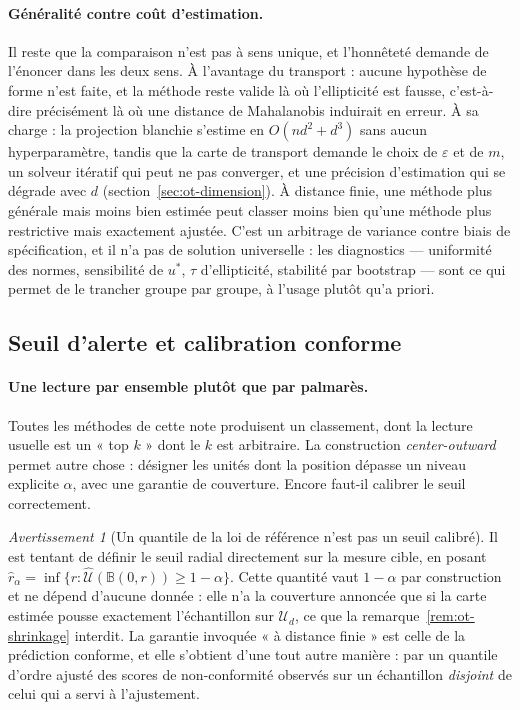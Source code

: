 \documentclass[11pt,a4paper]{article}
\theoremstyle{definition}
\theoremstyle{remark}
\newtheorem{avertissement}{Avertissement}[section]
\newcommand{\Unif}{\mathcal{U}}
\newcommand{\Bball}{\mathbb{B}}
\begin{document}
\paragraph{Généralité contre coût d'estimation.} Il reste que la comparaison n'est pas à
sens unique, et l'honnêteté demande de l'énoncer dans les deux sens. À l'avantage du
transport : aucune hypothèse de forme n'est faite, et la méthode reste valide là où
l'ellipticité est fausse, c'est-à-dire précisément là où une distance de Mahalanobis
induirait en erreur. À sa charge : la projection blanchie s'estime en $O(nd^2 + d^3)$ sans
aucun hyperparamètre, tandis que la carte de transport demande le choix de $\varepsilon$ et
de $m$, un solveur itératif qui peut ne pas converger, et une précision d'estimation qui se
dégrade avec $d$ (section~\ref{sec:ot-dimension}). À distance finie, une méthode plus
générale mais moins bien estimée peut classer moins bien qu'une méthode plus restrictive
mais exactement ajustée. C'est un arbitrage de variance contre biais de spécification, et
il n'a pas de solution universelle : les diagnostics --- uniformité des normes, sensibilité
de $u^{*}$, $\tau$ d'ellipticité, stabilité par bootstrap --- sont ce qui permet de le
trancher groupe par groupe, à l'usage plutôt qu'a priori.

\bigskip

\subsection{Seuil d'alerte et calibration conforme}
\label{sec:ot-alerte}

\medskip

\paragraph{Une lecture par ensemble plutôt que par palmarès.} Toutes les méthodes de cette
note produisent un classement, dont la lecture usuelle est un « top $k$ » dont le $k$ est
arbitraire. La construction \emph{center-outward} permet autre chose : désigner les unités
dont la position dépasse un niveau explicite $\alpha$, avec une garantie de couverture.
Encore faut-il calibrer le seuil correctement.

\medskip

\begin{avertissement}[Un quantile de la loi de référence n'est pas un seuil calibré]
  \label{av:ot-quantile}
  Il est tentant de définir le seuil radial directement sur la mesure cible, en posant
  $\hat{r}_\alpha = \inf\{r : \hat{\Unif}(\Bball(0,r)) \ge 1-\alpha\}$. Cette quantité vaut
  $1-\alpha$ par construction et ne dépend d'aucune donnée : elle n'a la couverture annoncée
  que si la carte estimée pousse exactement l'échantillon sur $\Unif_d$, ce que la
  remarque~\ref{rem:ot-shrinkage} interdit. La garantie invoquée « à distance finie » est
  celle de la prédiction conforme, et elle s'obtient d'une tout autre manière : par un
  quantile d'ordre ajusté des scores de non-conformité observés sur un échantillon
  \emph{disjoint} de celui qui a servi à l'ajustement.
\end{avertissement}
\end{document}
